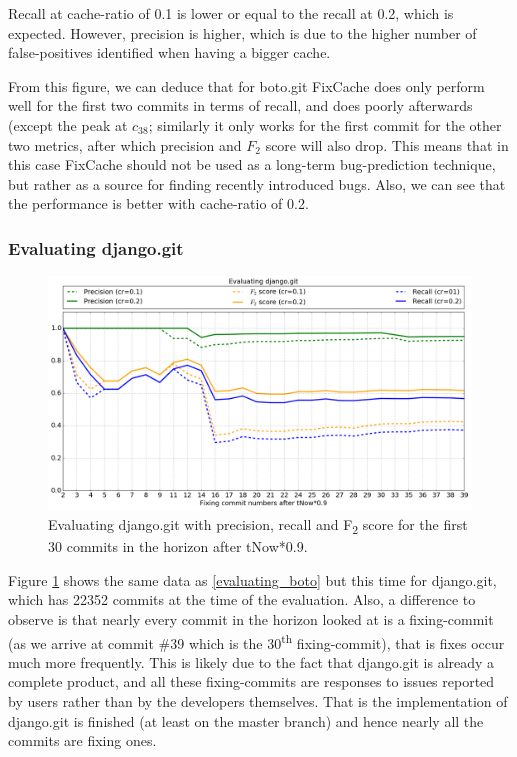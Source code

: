 \documentclass[12pt,twoside,notitlepage]{report}
\newcommand{\fxch}{FixCache}
\begin{document}
Recall at cache-ratio of 0.1 is lower or equal to the recall at 0.2, which is expected. However, precision is higher, which is due to the higher number of false-positives identified when having a bigger cache.

From this figure, we can deduce that for boto.git \fxch{} does only perform well for the first two commits in terms of recall, and does poorly afterwards (except the peak at $c_{38}$; similarly it only works for the first commit for the other two metrics, after which precision and $F_2$ score will also drop. This means that in this case \fxch{} should not be used as a long-term bug-prediction technique, but rather as a source for finding recently introduced bugs. Also, we can see that the performance is better with cache-ratio of 0.2.
\subsubsection{Evaluating django.git}
\begin{figure}[ht!]
\includegraphics[width=1.0\textwidth]{evaluating_django.png}
\caption[Evaluating django.git: recall, precision and $F_2$ score]{Evaluating django.git with precision, recall and F\textsubscript{2} score for the first 30 commits in the horizon after tNow*0.9.}
\label{evaluating_django}
\end{figure}
Figure \ref{evaluating_django} shows the same data as \ref{evaluating_boto} but this time for django.git, which has 22352 commits at the time of the evaluation. Also, a difference to observe is that nearly every commit in the horizon looked at is a fixing-commit (as we arrive at commit \#39 which is the 30\textsuperscript{th} fixing-commit), that is fixes occur much more frequently. This is likely due to the fact that django.git is already a complete product, and all these fixing-commits are responses to issues reported by users rather than by the developers themselves. That is the implementation of django.git is finished (at least on the master branch) and hence nearly all the commits are fixing ones. 
\end{document}

